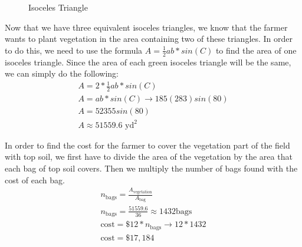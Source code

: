 \documentclass{article}
\begin{document}
\begin{center}
\begin{figure}[!htbp]
    \caption{Isoceles Triangle}
  \end{figure}
  Now that we have three equivalent isoceles triangles, we know that the farmer wants to plant vegetation in the area containing two of these triangles. In order to do this, we need to use the formula $ A = \frac{1}{2}ab*sin(C)$ to find the area of one isoceles triangle. Since the area of each green isoceles triangle will be the same, we can simply do the following:
  \begin{align}
    A = 2*\frac{1}{2} ab*sin(C) \\
    A = ab*sin(C) \rightarrow 185 (283) sin(80) \\
    A = 52355 sin(80) \\
    A \approx 51559.6 \text{ yd}^2
  \end{align}
  \par
  In order to find the cost for the farmer to cover the vegetation part of the field with top soil, we first have to divide the area of the vegetation by the area that each bag of top soil covers. Then we multiply the number of bags found with the cost of each bag.
  \begin{align}
    n_{\text{bags}} = \frac{A_{\text{vegetation}}}{A_{\text{bag}}} \\
    n_{\text{bags}} = \frac{51559.6}{36} \approx 1432 \text{bags} \\
    \text{cost} = \$ 12 * n_{\text{bags}} \rightarrow 12 * 1432 \\
    \text{cost} = \$ 17,184
  \end{align}

\end{center}
\end{document}
